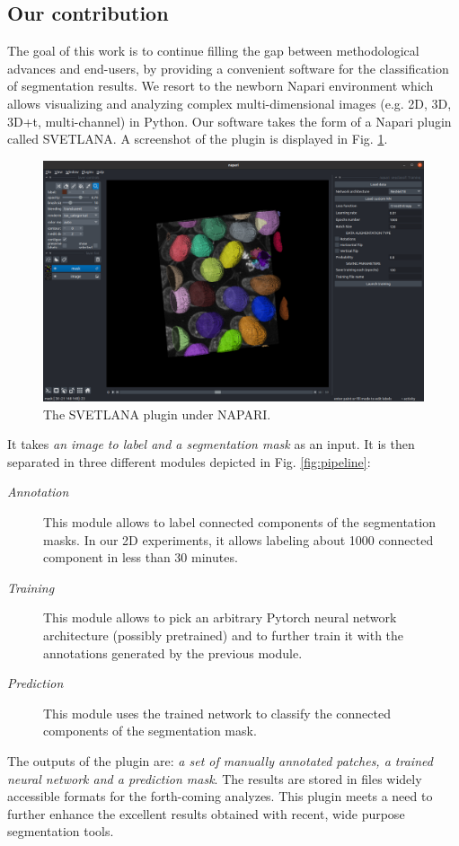 \documentclass{article}
\begin{document}
\subsection{Our contribution}

The goal of this work is to continue filling the gap between methodological advances and end-users, by providing a convenient software for the classification of segmentation results. 
We resort to the newborn Napari environment \cite{perkel2021python} which allows visualizing and analyzing complex multi-dimensional images (e.g. 2D, 3D, 3D+t, multi-channel) in Python.
Our software takes the form of a Napari plugin called SVETLANA. A screenshot of the plugin is displayed in Fig. \ref{fig:interface}.

\begin{figure}[htp!]
 \centering
 \includegraphics[width=\linewidth]{Figures/interface.png}
  \caption{The SVETLANA plugin under NAPARI. \label{fig:interface}}
\end{figure}

It takes \emph{an image to label and a segmentation mask} as an input. It is then separated in three different modules depicted in Fig. \ref{fig:pipeline}: 
\begin{description}
  \item[\emph{Annotation}] This module allows to label connected components of the segmentation masks. In our 2D experiments, it allows labeling about 1000 connected component in less than 30 minutes.
  \item[\emph{Training}] This module allows to pick an arbitrary Pytorch \cite{paszke2019pytorch} neural network architecture (possibly pretrained) and to further train it with the annotations generated by the previous module.
  \item[\emph{Prediction}] This module uses the trained network to classify the connected components of the segmentation mask.
\end{description}
The outputs of the plugin are: \emph{a set of manually annotated patches, a trained neural network and a prediction mask}. 
The results are stored in files widely accessible formats for the forth-coming analyzes. This plugin meets a need to further enhance the excellent results obtained with recent, wide purpose segmentation tools. 
\end{document}

